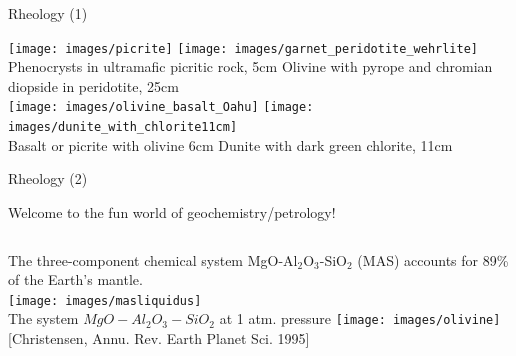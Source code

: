 \documentclass[handout]{beamer}
\begin{document}
\begin{frame}[plain]{Rheology (1)}


\begin{center}
\texttt{[image: images/picrite]} \hspace{1.5cm}
\texttt{[image: images/garnet\_peridotite\_wehrlite]} \\
{\tiny Phenocrysts in ultramafic picritic rock, 5cm \hspace{1cm}
Olivine with pyrope and chromian diopside in peridotite, 25cm} \\
\texttt{[image: images/olivine\_basalt\_Oahu]} \hspace{1cm}
\texttt{[image: images/dunite\_with\_chlorite11cm]} \\
{\tiny Basalt or picrite with olivine 6cm  \hspace{1cm}
Dunite with dark green chlorite, 11cm}
\end{center}




\end{frame}


\begin{frame}[plain]{Rheology (2)}

Welcome to the fun world of geochemistry/petrology!

\vspace{.4cm}

\begin{columns}[onlytextwidth]
{\tiny The three-component chemical system MgO-Al$_2$O$_3$-SiO$_2$ (MAS) accounts for 89\% of the Earth’s mantle.}\\
\texttt{[image: images/masliquidus]}\\
{\tiny The system $MgO-Al_2O_3-SiO_2$ at 1 atm. pressure} %
\texttt{[image: images/olivine]}\\
{\tiny [Christensen, Annu. Rev. Earth Planet Sci. 1995]}
\end{columns}

\end{frame}
\end{document}
